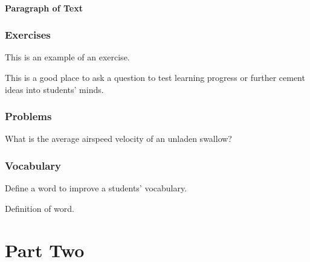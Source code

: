 \documentclass[11pt,fleqn]{book} %
\begin{document}
\subsection{Paragraph of Text}

\begin{example}
\lipsum[2]
\end{example}


\section{Exercises}

This is an example of an exercise.

\begin{exercise}
This is a good place to ask a question to test learning progress or further cement ideas into students' minds.
\end{exercise}


\section{Problems}

\begin{problem}
What is the average airspeed velocity of an unladen swallow?
\end{problem}


\section{Vocabulary}

Define a word to improve a students' vocabulary.

\begin{vocabulary}[Word]
Definition of word.
\end{vocabulary}


\part{Part Two}
\end{document}
